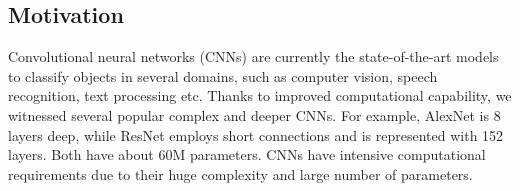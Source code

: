 %

\subsection*{Motivation}

Convolutional neural networks  (CNNs) are currently the state-of-the-art models to classify objects in several domains, such as computer vision, speech recognition, text processing etc. Thanks to improved computational capability, we witnessed several popular complex and deeper CNNs. For example, AlexNet is 8 layers deep, while ResNet employs short connections and is represented with 152 layers. Both have about 60M parameters. CNNs have intensive computational requirements due to their huge complexity and large number of parameters. 










